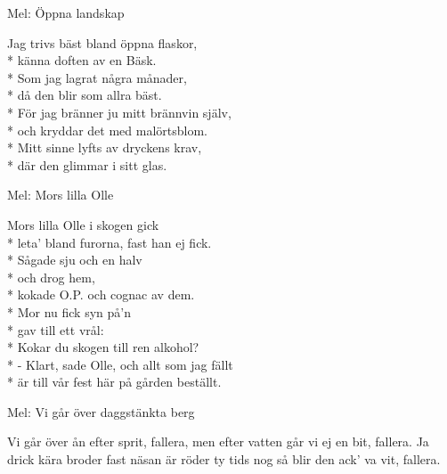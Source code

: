 \begin{SongText}
\begin{SongInfo}
    Mel: Öppna landskap
\end{SongInfo}
\begin{SongVerse}
    Jag trivs bäst bland öppna flaskor,\\*%
    känna doften av en Bäsk.\\*%
    Som jag lagrat några månader,\\*%
    då den blir som allra bäst.\\*%
    För jag bränner ju mitt brännvin själv,\\*%
    och kryddar det med malörtsblom.\\*%
    Mitt sinne lyfts av dryckens krav,\\*%
    där den glimmar i sitt glas.
\end{SongVerse}
\end{SongText}
\begin{SongText}[Skogskokarvisa]
\begin{SongInfo}
    Mel: Mors lilla Olle
\end{SongInfo}
\begin{SongVerse}
    Mors lilla Olle i skogen gick\\*%
    leta’ bland furorna, fast han ej fick.\\*%
    Sågade sju och en halv\\*%
    och drog hem,\\*%
    kokade O.P. och cognac av dem.\\*%
    Mor nu fick syn på’n\\*%
    gav till ett vrål:\\*%
    Kokar du skogen till ren alkohol?\\*%
    - Klart, sade Olle, och allt som jag fällt\\*%
    är till vår fest här på gården beställt.
\end{SongVerse}
\end{SongText}
\begin{SongText}
\begin{SongInfo}
    Mel: Vi går över daggstänkta berg
\end{SongInfo}
\begin{SongVerse}
    Vi går över ån efter sprit, fallera,
    men efter vatten går vi ej en bit, fallera.
    Ja drick kära broder fast näsan är röder
    ty tids nog så blir den ack’ va vit, fallera.
\end{SongVerse}
\end{SongText}
